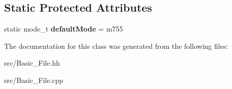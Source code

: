 \subsection*{Static Protected Attributes}
\begin{DoxyCompactItemize}
\item 
\hypertarget{classstb_1_1Basic__File_ab061435c287c8cffd42796e867c9a221}{static mode\+\_\+t {\bfseries default\+Mode} = m755}\label{classstb_1_1Basic__File_ab061435c287c8cffd42796e867c9a221}

\end{DoxyCompactItemize}


The documentation for this class was generated from the following files\+:\begin{DoxyCompactItemize}
\item 
src/Basic\+\_\+\+File.\+hh\item 
src/Basic\+\_\+\+File.\+cpp\end{DoxyCompactItemize}
